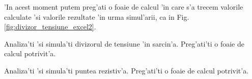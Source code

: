 'In acest moment putem preg'ati o foaie de calcul 'in care s'a trecem valorile calculate 'si valorile rezultate 'in urma simul'arii, ca in Fig. \ref{fig:divizor_tensiune_excel2}.


\begin{exercise}
  Analiza'ti 'si simula'ti divizorul de tensiune 'in sarcin'a. Preg'ati'ti o foaie de calcul potrivit'a.
\end{exercise}
\begin{exercise}
  Analiza'ti 'si simula'ti puntea rezistiv'a. Preg'ati'ti o foaie de calcul potrivit'a.
\end{exercise}


